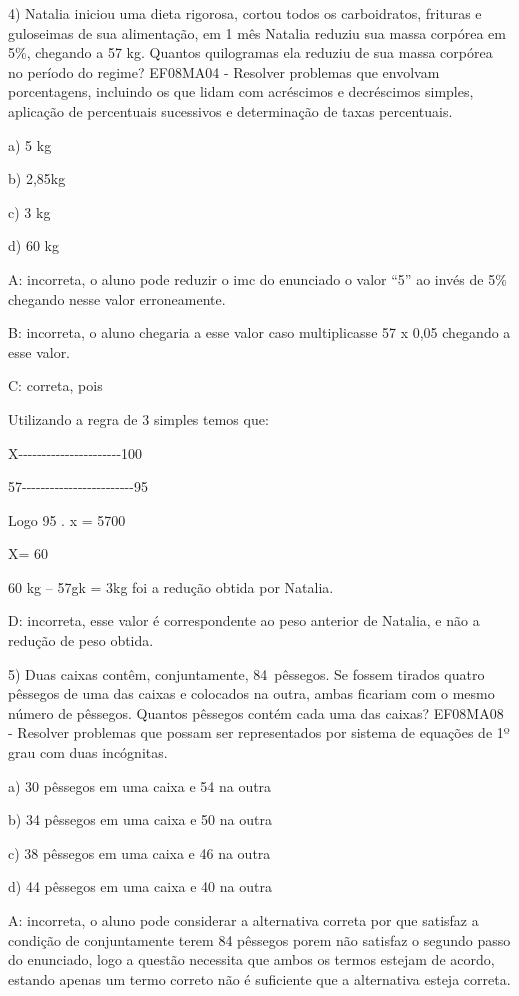{4) Natalia iniciou uma dieta rigorosa, cortou todos os carboidratos,
frituras e guloseimas de sua alimentação, em 1 mês Natalia reduziu sua
massa corpórea em 5\%, chegando a 57 kg. Quantos quilogramas ela reduziu
de sua massa corpórea no período do regime? EF08MA04 - Resolver
problemas que envolvam porcentagens, incluindo os que lidam com
acréscimos e decréscimos simples, aplicação de percentuais sucessivos e
determinação de taxas percentuais.

a) 5 kg

b) 2,85kg

c) 3 kg

d) 60 kg

A: incorreta, o aluno pode reduzir o imc do enunciado o valor ``5'' ao
invés de 5\% chegando nesse valor erroneamente.

B: incorreta, o aluno chegaria a esse valor caso multiplicasse 57 x 0,05
chegando a esse valor.

C: correta, pois

Utilizando a regra de 3 simples temos que:

X-\/-\/-\/-\/-\/-\/-\/-\/-\/-\/-\/-\/-\/-\/-\/-\/-\/-\/-\/-\/-\/-100

57-\/-\/-\/-\/-\/-\/-\/-\/-\/-\/-\/-\/-\/-\/-\/-\/-\/-\/-\/-\/-\/-\/-\/-95

Logo 95 . x = 5700

X= 60

60 kg -- 57gk = 3kg foi a redução obtida por Natalia.

D: incorreta, esse valor é correspondente ao peso anterior de Natalia, e
não a redução de peso obtida.

5) Duas caixas contêm, conjuntamente, 84~pêssegos. Se fossem tirados
quatro pêssegos de uma das caixas e colocados na outra, ambas ficariam
com o mesmo número de pêssegos. Quantos pêssegos contém cada uma das
caixas? EF08MA08 - Resolver problemas que possam ser representados por
sistema de equações de 1º grau com duas incógnitas.

a) 30 pêssegos em uma caixa e 54 na outra

b) 34 pêssegos em uma caixa e 50 na outra

c) 38 pêssegos em uma caixa e 46 na outra

d) 44 pêssegos em uma caixa e 40 na outra

A: incorreta, o aluno pode considerar a alternativa correta por que
satisfaz a condição de conjuntamente terem 84 pêssegos porem não
satisfaz o segundo passo do enunciado, logo a questão necessita que
ambos os termos estejam de acordo, estando apenas um termo correto não é
suficiente que a alternativa esteja correta.

}
